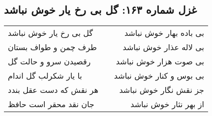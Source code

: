 \begin{center}
\section*{غزل شماره ۱۶۳: گل بی رخ یار خوش نباشد}
\label{sec:sh163}
\begin{longtable}{l p{0.5cm} r}
گل بی رخ یار خوش نباشد
&&
بی باده بهار خوش نباشد
\\
طرف چمن و طواف بستان
&&
بی لاله عذار خوش نباشد
\\
رقصیدن سرو و حالت گل
&&
بی صوت هزار خوش نباشد
\\
با یار شکرلب گل اندام
&&
بی بوس و کنار خوش نباشد
\\
هر نقش که دست عقل بندد
&&
جز نقش نگار خوش نباشد
\\
جان نقد محقر است حافظ
&&
از بهر نثار خوش نباشد
\\
\end{longtable}
\end{center}

